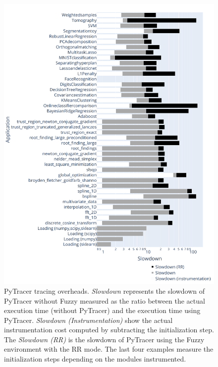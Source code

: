 \documentclass[10pt,journal,compsoc]{IEEEtran}
\newcommand{\pytracer}[0]{PyTracer\xspace}
\DeclareRobustCommand{\add}[1]{\textcolor{ao(english)}{#1}}%
\DeclareRobustCommand{\remove}[1]{}
\DeclareRobustCommand{\add}[1]{#1}
\DeclareRobustCommand{\remove}[1]{}
\begin{document}
\begin{figure}
    \centering
    \includegraphics[width=\linewidth]{figure/performance.pdf}
    \caption{
        \pytracer tracing overheads. \textit{Slowdown} represents the slowdown
        of \pytracer without Fuzzy measured as the ratio between the actual
        execution time (without \pytracer) and the execution time using
        \pytracer. \textit{Slowdown (Instrumentation)} show the actual
        instrumentation cost computed by subtracting the initialization step.
        The \textit{Slowdown (RR)} \remove{and \textit{Slowdown (MCA)} are} \add{is} the slowdown
        of \pytracer using the Fuzzy environment with \add{the} RR \remove{and Full MCA} mode\remove{s}. The
        \remove{first} \add{last} four examples measure the initialization
        steps depending on the modules instrumented. 
    }
    \label{fig:performance_tracing}
\end{figure}
\end{document}
